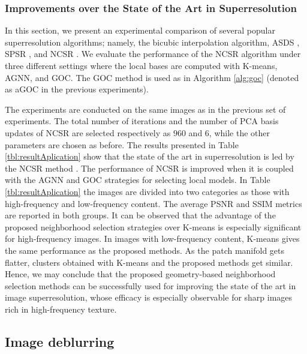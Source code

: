 \documentclass[journal]{IEEEtran}
\begin{document}
\subsubsection{Improvements over the State of the Art in Superresolution}
\label{ssec:state_art}

In this section, we present an experimental comparison of several popular superresolution algorithms; namely, the bicubic interpolation algorithm, ASDS \cite{Dong11image}, SPSR \cite{Peleg14a}, and NCSR \cite{Dong13nonlocally}. We evaluate the performance of the NCSR algorithm under three different settings where the local bases are computed with K-means, AGNN, and GOC. The GOC method is used as in Algorithm \ref{alg:goc} (denoted as aGOC in the previous experiments). 

The experiments are conducted on the same images as in the previous set of experiments. The total number of iterations and the number of PCA basis updates of NCSR are selected respectively as $960$ and  $6$, while the other parameters are chosen as before. The results  presented in Table \ref{tbl:resultAplication} show that the  state of the art in superresolution is led by the NCSR method \cite{Dong13nonlocally}. The performance of NCSR is improved when it is coupled with the AGNN and GOC strategies for selecting local models. In Table \ref{tbl:resultAplication} the images are divided into two categories as those with high-frequency and low-frequency content. The average PSNR and SSIM metrics are reported in both groups. It can be observed that the advantage of the proposed neighborhood selection strategies over K-means is especially significant for high-frequency images. In images with low-frequency content, K-means gives the same performance as the proposed methods. As the patch manifold gets flatter, clusters obtained with K-means and the proposed methods get similar. Hence, we may conclude that the proposed geometry-based neighborhood selection methods can be successfully used for improving the state of the art in image superresolution, whose efficacy is especially observable for sharp images rich in high-frequency texture.




\subsection{Image deblurring}
\label{ssec:exp_deblur}
\end{document}
